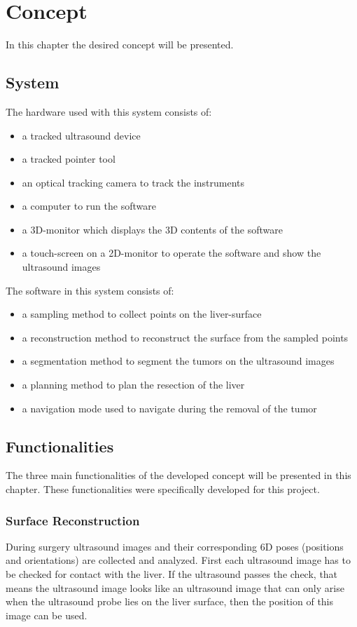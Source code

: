\chapter{Concept}
In this chapter the desired concept will be presented. 
\section{System}
The hardware used with this system consists of:
\begin{itemize}
  \item a tracked ultrasound device
  \item a tracked pointer tool
  \item an optical tracking camera to track the instruments
  \item a computer to run the software
  \item a 3D-monitor which displays the 3D contents of the software 
  \item a touch-screen on a 2D-monitor to operate the software and show the
    ultrasound images
\end{itemize}
The software in this system consists of:
\begin{itemize}
  \item a sampling method to collect points on the liver-surface
  \item a reconstruction method to reconstruct the surface from the sampled points
  \item a segmentation method to segment the tumors on the ultrasound images
  \item a planning method to plan the resection of the liver
  \item a navigation mode used to navigate during the removal of the tumor
\end{itemize}
\section{Functionalities}
The three main functionalities of the developed concept will be presented in
this chapter. These functionalities were specifically developed for this project.
\subsection{Surface Reconstruction}
During surgery ultrasound images and their corresponding 6D poses (positions and
orientations) are collected and analyzed. First each ultrasound image has to be
checked for contact with the liver. If the ultrasound passes the check, that
means the ultrasound image looks like an ultrasound image that can only arise
when the ultrasound probe lies on the liver surface, then the position of this
image can be used.

